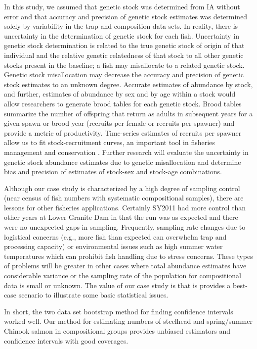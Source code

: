 \documentclass[11pt]{article}
\begin{document}
In this study, we assumed that genetic stock was determined from IA without error and that accuracy and precision of genetic stock estimates was determined solely by variability in the trap and composition data sets. In reality, there is uncertainty in the determination of genetic stock for each fish. Uncertainty in genetic stock determination is related to the true genetic stock of origin of that individual and the relative genetic relatedness of that stock to all other genetic stocks present in the baseline; a fish may misallocate to a related genetic stock. Genetic stock misallocation may decrease the accuracy and precision of genetic stock estimates to an unknown degree. Accurate estimates of abundance by stock, and further, estimates of abundance by sex and by age within a stock would allow researchers to generate brood tables for each genetic stock. Brood tables summarize the number of offspring that return as adults in subsequent years for a given spawn or brood year (recruits per female or recruits per spawner) and provide a metric of productivity. Time-series estimates of recruits per spawner allow us to fit stock-recruitment curves, an important tool in fisheries management and conservation \cite{Ricker1973,Hilborn2003}. Further research will evaluate the uncertainty in genetic stock abundance estimates due to genetic misallocation and determine bias and precision of estimates of stock-sex and stock-age combinations.

Although our case study is characterized by a high degree of sampling control (near census of fish numbers with systematic compositional samples), there are lessons for other fisheries applications. Certainly SY2011 had more control than other years at Lower Granite Dam in that the run was as expected and there were no unexpected gaps in sampling. Frequently, sampling rate changes due to logistical concerns (e.g., more fish than expected can overwhelm trap and processing capacity) or environmental issues such as high summer water temperatures which can prohibit fish handling due to stress concerns. These types of problems will be greater in other cases where total abundance estimates have considerable variance or the sampling rate of the population for compositional data is small or unknown. The value of our case study is that is provides a best-case scenario to illustrate some basic statistical issues.

In short, the two data set bootstrap method for finding confidence intervals worked well. Our method for estimating numbers of steelhead and spring/summer Chinook salmon in compositional groups provides unbiased estimators and confidence intervals with good coverages.



\end{document}
